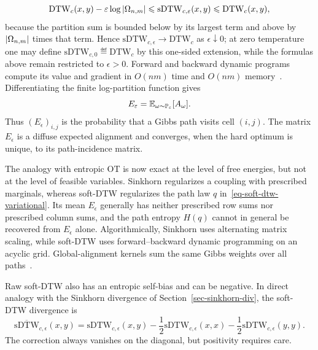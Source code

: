 \begin{equation}\label{eq-soft-dtw-zero-temperature-bound}
	\mathrm{DTW}_c(x,y)-\varepsilon\log\left\lvert\Omega_{n,m}\right\rvert
	\leqslant
	\mathrm{sDTW}_{c,\varepsilon}(x,y)
	\leqslant
	\mathrm{DTW}_c(x,y),
\end{equation}
because the partition sum is bounded below by its largest term and above by $\left\lvert\Omega_{n,m}\right\rvert$ times that term. Hence $\mathrm{sDTW}_{c,\epsilon}\to\mathrm{DTW}_c$ as $\epsilon\downarrow0$; at zero temperature one may define $\mathrm{sDTW}_{c,0}\eqdef\mathrm{DTW}_c$ by this one-sided extension, while the formulas above remain restricted to $\epsilon>0$. Forward and backward dynamic programs compute its value and gradient in $O(nm)$ time and $O(nm)$ memory~\cite{CuturiBlondel2017SoftDTW}. Differentiating the finite log-partition function gives
\begin{equation}\label{eq-soft-dtw-expected-alignment}
	E_\varepsilon
	=
	\mathbb{E}_{\omega\sim\mathbb{P}_\varepsilon}[A_\omega].
\end{equation}
Thus $(E_\epsilon)_{i,j}$ is the probability that a Gibbs path visits cell $(i,j)$. The matrix $E_\epsilon$ is a diffuse expected alignment and converges, when the hard optimum is unique, to its path-incidence matrix.

The analogy with entropic OT is now exact at the level of free energies, but not at the level of feasible variables. Sinkhorn regularizes a coupling with prescribed marginals, whereas soft-DTW regularizes the path law $q$ in~\eqref{eq-soft-dtw-variational}. Its mean $E_\epsilon$ generally has neither prescribed row sums nor prescribed column sums, and the path entropy $H(q)$ cannot in general be recovered from $E_\epsilon$ alone. Algorithmically, Sinkhorn uses alternating matrix scaling, while soft-DTW uses forward--backward dynamic programming on an acyclic grid. Global-alignment kernels sum the same Gibbs weights over all paths~\cite{CuturiVertBirkenesMatsui2007GlobalAlignment,Cuturi2011GlobalAlignment}.

Raw soft-DTW also has an entropic self-bias and can be negative. In direct analogy with the Sinkhorn divergence of Section~\ref{sec-sinkhorn-div}, the soft-DTW divergence is
\begin{equation}\label{eq-soft-dtw-divergence}
	\overline{\mathrm{sDTW}}_{c,\epsilon}(x,y)
	=
	\mathrm{sDTW}_{c,\epsilon}(x,y)
	-\frac12\mathrm{sDTW}_{c,\epsilon}(x,x)
	-\frac12\mathrm{sDTW}_{c,\epsilon}(y,y).
\end{equation}
The correction always vanishes on the diagonal, but positivity requires care.

